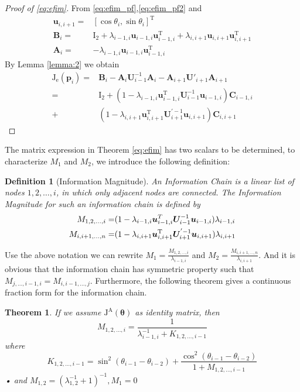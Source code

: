 \documentclass[conference]{IEEEtran}
\newtheorem{theorem}{Theorem}
\newtheorem{definition}{Definition}
\begin{document}
\begin{proof}[Proof of \eqref{eq:efim}]
From \eqref{eq:efim_pf},\eqref{eq:efim_pf2} and 
\begin{align*}
\bm{u}_{i,i+1}=&[\cos\theta_i,\sin\theta_i]^{\textrm{T}}\\
\bm{B}_i=&\bm{\mathrm{I}}_2+\lambda_{i-1,i}\bm{u}_{i-1,i}\bm{u}_{i-1,i}^{\textrm{T}}+\lambda_{i,i+1}\bm{u}_{i,i+1}\bm{u}_{i,i+1}^{\textrm{T}}\\
\bm{A}_i=&-\lambda_{i-1,i}\bm{u}_{i-1,i}\bm{u}_{i-1,i}^{\textrm{T}}
\end{align*}
By Lemma \ref{lemma:2} we obtain
\begin{align}
\bm{\mathrm{J}}_{\mathrm{e}}(\bm{p}_i)=&\bm{B}_i-\bm{A}_i \bm{U}_{i-1}^{-1} \bm{A}_i-\bm{A}_{i+1}\bm{U}'_{i+1} \bm{A}_{i+1}\nonumber\\
=&\bm{\mathrm{I}}_2+(1-\lambda_{i-1,i}\bm{u}_{i-1,i}^{\textrm{T}}\bm{U}_{i-1}^{-1}\bm{u}_{i-1,i})\bm{C}_{i-1,i}\nonumber\\
+&(1-\lambda_{i,i+1}\bm{u}_{i,i+1}^{\textrm{T}}\bm{U}^{'-1}_{i+1}\bm{u}_{i,i+1})\bm{C}_{i,i+1}
\end{align}
\end{proof}
The matrix expression in Theorem \eqref{eq:efim} has two scalars to be determined, to characterize $M_1$ and $M_2$, we introduce the following definition:
\begin{definition}[Information Magnitude]\label{def:1}
An Information Chain is a linear list of nodes $1,2,\dots,i$, in which only adjacent nodes are connected. 
The Information Magnitude for such an information chain is defined by
\begin{align}\notag\label{eq:im}
M_{1,2,\dots,i}=&(1-\lambda_{i-1,i}\bm{u}_{i-1,i}^T\bm{U}_{i-1}^{-1}\bm{u}_{i-1,i})\lambda_{i-1,i}\\
M_{i,i+1,\dots,n}=&(1-\lambda_{i,i+1}\bm{u}_{i,i+1}^{\textrm{T}}\bm{U}^{'-1}_{i+1}\bm{u}_{i,i+1})\lambda_{i,i+1}
\end{align}
\end{definition}
Use the above notation we can rewrite $M_1=\frac{M_{1,2,\dots,i}}{\lambda_{i-1,i}}$ and $M_2=\frac{M_{i,i+1,\dots,n}}{\lambda_{i,i+1}}$. And it is obvious that the information chain has symmetric property such that $M_{j,\dots,i-1,i}=M_{i,i-1,\dots,j}$.
Furthermore, the following theorem gives a continuous fraction form for the information chain.
\begin{theorem}\label{thm:M12i}
If we assume $\bm{\mathrm{J}}^\mathrm{A}(\bm{\theta})$ as identity matrix, then
\begin{equation}\label{eq:MM}
M_{1,2,\dots,i}=\frac{1}{\lambda_{i-1,i}^{-1}+K_{1,2,\dots,i-1}}
\end{equation}
where
\begin{equation*}
K_{1,2,\dots,i-1}=\sin^2	(\theta_{i-1}-\theta_{i-2})+\frac{\cos^2(\theta_{i-1}-\theta_{i-2})}{1+M_{1,2,\dots,i-1}}
\end{equation*}•
and $M_{1,2}=(\lambda_{1,2}^{-1}+1)^{-1},M_1=0$
\end{theorem}
\end{document}
